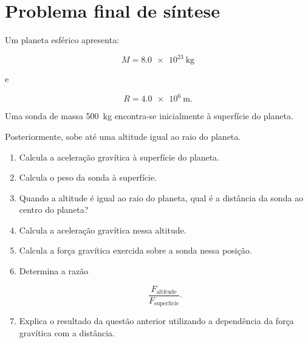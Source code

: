 \documentclass[11pt,a4paper]{article}
\newcommand{\resposta}[1][1]{
	\vspace{#1cm}
}
\begin{document}
	\section{Problema final de síntese}
	
	Um planeta esférico apresenta:
	
	\[
	M=\SI{8.0e23}{\kilogram}
	\]
	
	e
	
	\[
	R=\SI{4.0e6}{\metre}.
	\]
	
	Uma sonda de massa \SI{500}{\kilogram} encontra-se inicialmente à
	superfície do planeta.
	
	Posteriormente, sobe até uma altitude igual ao raio do planeta.
	
	\begin{enumerate}[label=\textbf{\arabic*.},resume]
		
		\item Calcula a aceleração gravítica à superfície do planeta.
		
		\resposta[1.2]
		
		\item Calcula o peso da sonda à superfície.
		
		\resposta[0.9]
		
		\item Quando a altitude é igual ao raio do planeta, qual é a distância da
		sonda ao centro do planeta?
		
		\resposta[0.7]
		
		\item Calcula a aceleração gravítica nessa altitude.
		
		\resposta[1.1]
		
		\item Calcula a força gravítica exercida sobre a sonda nessa posição.
		
		\resposta[1.0]
		
		\item Determina a razão
		
		\[
		\frac{F_{\text{altitude}}}
		{F_{\text{superfície}}}.
		\]
		
		\resposta[0.9]
		
		\item Explica o resultado da questão anterior utilizando a dependência da
		força gravítica com a distância.
		
		\resposta[1.1]
		
	\end{enumerate}
	
\end{document}
